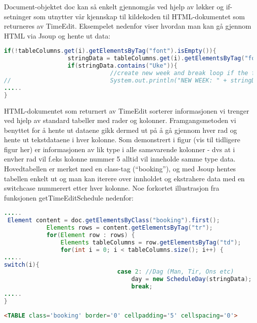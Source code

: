 \documentclass[../main.tex]{subfiles}
\begin{document}
Document-objektet doc kan så enkelt gjennomgås ved hjelp av løkker og if-setninger som utnytter vår kjennskap til kildekoden til HTML-dokumentet som returneres av TimeEdit. Eksempelet nedenfor viser hvordan man kan gå gjennom HTML via Jsoup og hente ut data:

\begin{lstlisting}[language=Java, frame=single, caption={asdasdsadasdasdasdsadsadasdasdsadsa}]
if(!tableColumns.get(i).getElementsByTag("font").isEmpty()){
                  stringData = tableColumns.get(i).getElementsByTag("font").first().text();
                  if(stringData.contains("Uke")){
                              //create new week and break loop if the first element contains Uke
//                            System.out.println("NEW WEEK: " + stringData);
.....
}
\end{lstlisting}

HTML-dokumentet som returnert av TimeEdit sorterer informasjonen vi trenger ved hjelp av standard tabeller med rader og kolonner. Framgangsmetoden vi benyttet for å hente ut dataene gikk dermed ut på å gå gjennom hver rad og hente ut tekstdataene i hver kolonne. Som demonstrert i figur (vis til tidligere figur her) er informasjonen av lik type i alle samsvarende kolonner - dvs at i envher rad vil f.eks kolonne nummer 5 alltid vil inneholde samme type data.
Hovedtabellen er merket med en class-tag (“booking”), og med Jsoup hentes tabellen enkelt ut og man kan iterere over innholdet og ekstrahere data med en switchcase nummerert etter hver kolonne. Noe forkortet illustrasjon fra funksjonen getTimeEditSchedule nedenfor:

\begin{lstlisting}[language=Java, frame=single, caption={asdasdsadasdasdasdsadsadasdasdsadsa}]
.....
 Element content = doc.getElementsByClass("booking").first();
            Elements rows = content.getElementsByTag("tr");
            for(Element row : rows) {
                Elements tableColumns = row.getElementsByTag("td");
                for(int i = 0; i < tableColumns.size(); i++) {
.....
switch(i){
                                case 2: //Dag (Man, Tir, Ons etc)
                                    day = new ScheduleDay(stringData);
                                    break;
.....
}
\end{lstlisting}

\begin{lstlisting}[language=HTML, frame=single, caption={asdasdsadasdasdasdsadsadasdasdsadsa}]
<TABLE class='booking' border='0' cellpadding='5' cellspacing='0'>
\end{lstlisting}
\end{document}
